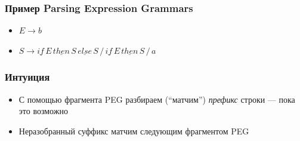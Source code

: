 \documentclass{beamer}
\begin{document}
\begin{frame}[fragile]
  \transwipe[direction=90]
  \frametitle{Пример Parsing Expression Grammars}
  \begin{itemize}
    \item $E \rightarrow b $
    \item $S \rightarrow \underline{if} \, E \, \underline{then} \, S \, \underline{else} \, S \, / \, \underline{if} \, E \, \underline{then} \, S \, / \, a$    
  \end{itemize}
\end{frame}

\begin{frame}[fragile]
  \transwipe[direction=90]
  \frametitle{Интуиция}
  \begin{itemize}
    \item С помощью фрагмента PEG разбираем (``матчим'') \textit{префикс} строки --- пока это возможно
    \item Неразобранный суффикс матчим следующим фрагментом PEG
  \end{itemize}
\end{frame}
\end{document}
